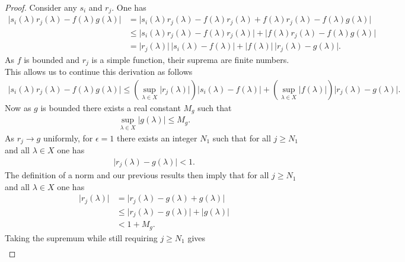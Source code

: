 \begin{proof}
    \leanok
Consider any $s_i$ and $r_j$. One has
\begin{align}
    \lvert s_i(\lambda)r_j(\lambda) - f(\lambda)g(\lambda) \rvert &=   \lvert s_i(\lambda)r_j(\lambda) - f(\lambda)r_j(\lambda) + f(\lambda)r_j(\lambda) - f(\lambda)g(\lambda) \rvert \\
                                                      &\le \lvert s_i(\lambda)r_j(\lambda) - f(\lambda)r_j(\lambda) \rvert + \lvert f(\lambda)r_j(\lambda) - f(\lambda)g(\lambda) \rvert \\
                                                      &= \lvert r_j(\lambda) \rvert \, \lvert s_i(\lambda) - f(\lambda) \rvert + \lvert f(\lambda) \rvert \, \lvert r_j(\lambda) - g(\lambda) \rvert.
\end{align}
As $f$ is bounded and $r_j$ is a simple function, their suprema are finite numbers. This allows us to continue this derivation as follows
\begin{align}
    \lvert s_i(\lambda)r_j(\lambda) - f(\lambda)g(\lambda) \rvert \le \left( \sup\limits_{\lambda \in X} \lvert r_j(\lambda) \rvert \right) \lvert s_i(\lambda) - f(\lambda) \rvert + \left( \sup\limits_{\lambda \in X} \lvert f(\lambda) \rvert \right) \lvert r_j(\lambda) - g(\lambda) \rvert.
\end{align}
Now as $g$ is bounded there exists a real constant $M_g$ such that
\begin{align}
    \sup\limits_{\lambda \in X} \lvert g(\lambda) \rvert \le M_g.
\end{align}
As $r_j \rightarrow g$ uniformly, for $\epsilon = 1$ there exists an integer $N_1$ such that for all $j \ge N_1$ and all $\lambda \in X$ one has
\begin{align}
    \lvert r_j(\lambda) - g(\lambda) \rvert < 1.
\end{align}
The definition of a norm and our previous results then imply that for all $j \ge N_1$ and all $\lambda \in X$ one has
\begin{align}
    \lvert r_j(\lambda) \rvert &= \lvert r_j(\lambda) - g(\lambda) + g(\lambda) \rvert \\
                               &\le \lvert r_j(\lambda) - g(\lambda) \rvert + \lvert g(\lambda) \rvert \\
                               &< 1 + M_g.
\end{align}
Taking the supremum while still requiring $j \ge N_1$ gives
\begin{align}

\end{align}
\end{proof}
